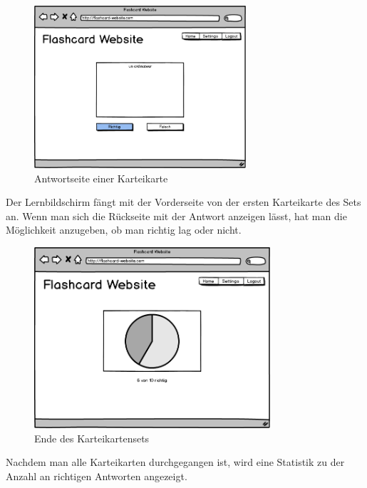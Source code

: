 \begin{figure}[H]
    \centering
    \includegraphics[width=0.7\textwidth]{images/Lernscreen-Antwort.png}
    \caption{Antwortseite einer Karteikarte}
    \label{fig:lernscreen-antwort}
\end{figure}

Der Lernbildschirm fängt mit der Vorderseite von der ersten Karteikarte des Sets an. Wenn man sich die Rückseite mit der Antwort anzeigen lässt, hat man die Möglichkeit anzugeben, ob man richtig lag oder nicht.

\begin{figure}[H]
    \centering
    \includegraphics[width=0.78\textwidth]{images/Lernscreen-Ergebnis.png}
    \caption{Ende des Karteikartensets}
    \label{fig:lernscreen-ergbenis}
\end{figure}

\noindent Nachdem man alle Karteikarten durchgegangen ist, wird eine Statistik zu der Anzahl an richtigen Antworten angezeigt.
